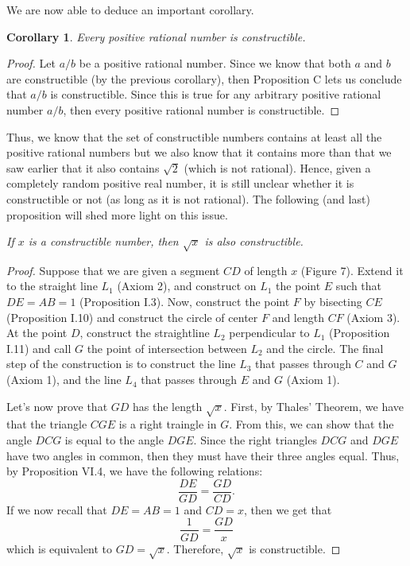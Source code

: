 \documentclass{article}
\theoremstyle{plain}
\newtheorem*{corollary}{Corollary}
\theoremstyle{definition}
\newenvironment{customthm}[1]
  {\renewcommand\theinnercustomthm{#1}\innercustomthm}
  {\endinnercustomthm}
\begin{document}
We are now able to deduce an important corollary.

\begin{corollary}
    Every positive rational number is constructible.
\end{corollary}

\begin{proof}
    Let $a/b$ be a positive rational number. Since we know that both $a$ and $b$ are constructible (by the previous corollary), then Proposition C lets us conclude that $a/b$ is constructible. Since this is true for any arbitrary positive rational number $a/b$, then every positive rational number is constructible.
\end{proof}

Thus, we know that the set of constructible numbers contains at least all the positive rational numbers but we also know that it contains more than that we saw earlier that it also contains $\sqrt{2}$ (which is not rational). Hence, given a completely random positive real number, it is still unclear whether it is constructible or not (as long as it is not rational). The following (and last) proposition will shed more light on this issue.

\newpage

\begin{customthm}{D}\label{D}
    \textit{If $x$ is a constructible number, then $\sqrt{x}$ is also constructible.}
\end{customthm}

\begin{proof}
    Suppose that we are given a segment $CD$ of length $x$ (Figure 7). Extend it to the straight line $L_1$ (Axiom 2), and construct on $L_1$ the point $E$ such that $DE = AB = 1$ (Proposition I.3). Now, construct the point $F$ by bisecting $CE$ (Proposition I.10) and construct the circle of center $F$ and length $CF$ (Axiom 3). At the point $D$, construct the straightline $L_2$ perpendicular to $L_1$ (Proposition I.11) and call $G$ the point of intersection between $L_2$ and the circle. The final step of the construction is to construct the line $L_3$ that passes through $C$ and $G$ (Axiom 1), and the line $L_4$ that passes through $E$ and $G$ (Axiom 1).

    Let's now prove that $GD$ has the length $\sqrt{x}$. First, by Thales' Theorem, we have that the triangle $CGE$ is a right traingle in $G$. From this, we can show that the angle $DCG$ is equal to the angle $DGE$. Since the right triangles $DCG$ and $DGE$ have two angles in common, then they must have their three angles equal. Thus, by Proposition VI.4, we have the following relations:
    $$\frac{DE}{GD} = \frac{GD}{CD}.$$
    If we now recall that $DE = AB = 1$ and $CD = x$, then we get that
    $$\frac{1}{GD} = \frac{GD}{x}$$
    which is equivalent to $GD = \sqrt{x}$. Therefore, $\sqrt{x}$ is constructible.
\end{proof}
\end{document}
